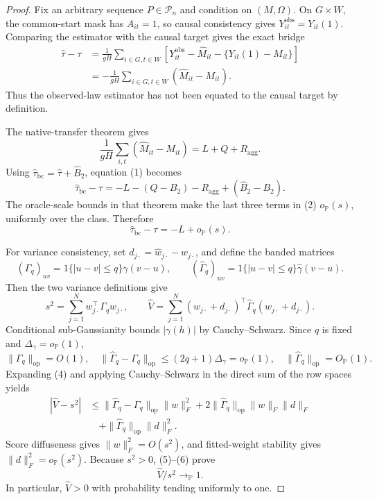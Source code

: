 \documentclass{article}
\begin{document}
\begin{proof}
Fix an arbitrary sequence \(P\in\mathcal P_n\) and condition on \((M,\Omega)\).  On \(G\times W\), the common-start mask has \(A_{it}=1\), so causal consistency gives \(Y^{\mathrm{obs}}_{it}=Y_{it}(1)\).  Comparing the estimator with the causal target gives the exact bridge
\[
 \begin{aligned}
 \widehat\tau-\tau
 &=\frac1{gH}\sum_{i\in G,t\in W}
 \left[Y^{\mathrm{obs}}_{it}-\widehat M_{it}
 -\{Y_{it}(1)-M_{it}\}\right]\\
 &=-\frac1{gH}\sum_{i\in G,t\in W}(\widehat M_{it}-M_{it}).
 \end{aligned}
 \tag{1}
\]
Thus the observed-law estimator has not been equated to the causal target by definition.

The native-transfer theorem gives
\[
 \frac1{gH}\sum_{i,t}(\widehat M_{it}-M_{it})=L+Q+R_{\mathrm{agg}}.
\]
Using \(\widehat\tau_{\mathrm{bc}}=\widehat\tau+\widehat B_2\), equation (1) becomes
\[
 \widehat\tau_{\mathrm{bc}}-\tau
 =-L-(Q-B_2)-R_{\mathrm{agg}}+(\widehat B_2-B_2).
 \tag{2}
\]
The oracle-scale bounds in that theorem make the last three terms in (2) \(o_{\mathbb P}(s)\), uniformly over the class.  Therefore
\[
 \widehat\tau_{\mathrm{bc}}-\tau=-L+o_{\mathbb P}(s).
 \tag{3}
\]

For variance consistency, set \(d_{j\cdot}=\widehat w_{j\cdot}-w_{j\cdot}\), and define the banded matrices
\[
 (\Gamma_q)_{uv}=1\{|u-v|\le q\}\gamma(v-u),
 \qquad
 (\widehat\Gamma_q)_{uv}=1\{|u-v|\le q\}\widehat\gamma(v-u).
\]
Then the two variance definitions give
\[
 s^2=\sum_{j=1}^Nw_{j\cdot}^{\top}\Gamma_qw_{j\cdot},
 \qquad
 \widehat V=\sum_{j=1}^N(w_{j\cdot}+d_{j\cdot})^{\top}
 \widehat\Gamma_q(w_{j\cdot}+d_{j\cdot}).
 \tag{4}
\]
Conditional sub-Gaussianity bounds \(|\gamma(h)|\) by Cauchy--Schwarz.  Since \(q\) is fixed and \(\Delta_\gamma=o_{\mathbb P}(1)\),
\[
 \|\Gamma_q\|_{\mathrm{op}}=O(1),
 \quad
 \|\widehat\Gamma_q-\Gamma_q\|_{\mathrm{op}}
 \le(2q+1)\Delta_\gamma=o_{\mathbb P}(1),
 \quad
 \|\widehat\Gamma_q\|_{\mathrm{op}}=O_{\mathbb P}(1).
 \tag{5}
\]
Expanding (4) and applying Cauchy--Schwarz in the direct sum of the row spaces yields
\[
 \begin{aligned}
 |\widehat V-s^2|
 &\le\|\widehat\Gamma_q-\Gamma_q\|_{\mathrm{op}}\|w\|_F^2
 +2\|\widehat\Gamma_q\|_{\mathrm{op}}\|w\|_F\|d\|_F\\
 &\quad+\|\widehat\Gamma_q\|_{\mathrm{op}}\|d\|_F^2.
 \end{aligned}
 \tag{6}
\]
Score diffuseness gives \(\|w\|_F^2=O(s^2)\), and fitted-weight stability gives \(\|d\|_F^2=o_{\mathbb P}(s^2)\).  Because \(s^2>0\), (5)--(6) prove
\[
 \widehat V/s^2\to_{\mathbb P}1.
 \tag{7}
\]
In particular, \(\widehat V>0\) with probability tending uniformly to one.


\end{proof}
\end{document}
